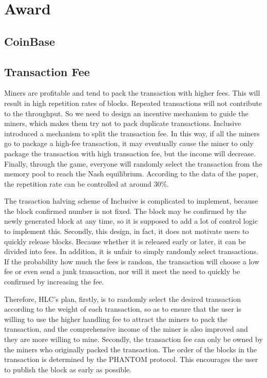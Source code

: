 \documentclass[a4paper,11pt]{article}
\begin{document}
\section{Award}

\subsection{CoinBase}

\subsection{Transaction Fee}

Miners are profitable and tend to pack the transaction with higher fees. This will result in high repetition rates of blocks. Repeated transactions will not contribute to the throughput. So we need to design an incentive mechanism to guide the miners, which makes them try not to pack duplicate transactions. Inclusive introduced a mechanism to split the transaction fee. In this way, if all the miners go to package a high-fee transaction, it may eventually cause the miner to only package the transaction with high transaction fee, but the income will decrease. Finally, through the game, everyone will randomly select the transaction from the memory pool to reach the Nash equilibrium. According to the data of the paper, the repetition rate can be controlled at around 30\%.

The trasaction halving scheme of Inclusive is complicated to implement, because the block confirmed number is not fixed. The block may be confirmed by the newly generated block at any time, so it is supposed to add a lot of control logic to implement this. Secondly, this design, in fact, it does not motivate users to quickly release blocks. Because whether it is released early or later, it can be divided into fees. In addition, it is unfair to simply randomly select transactions. If the probability how much the fees is random, the transaction will choose a low fee or even send a junk transaction, nor will it meet the need to quickly be confirmed by increasing the fee.

Therefore, HLC's plan, firstly, is to randomly select the desired transaction according to the weight of each transaction, so as to ensure that the user is willing to use the higher handling fee to attract the miners to pack the transaction, and the comprehensive income of the miner is also improved and they are more willing to mine. Secondly, the transaction fee can only be owned by the miners who originally packed the transaction. The order of the blocks in the transaction is determined by the PHANTOM protocol. This encourages the user to publish the block as early as possible.
\end{document}
